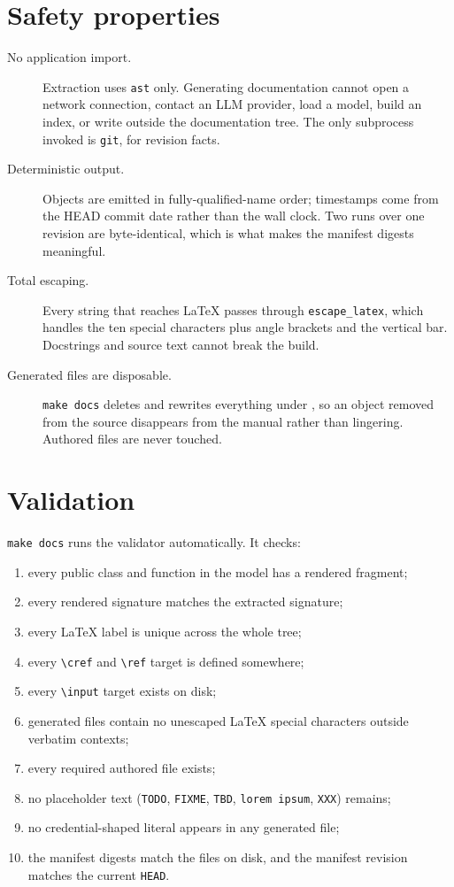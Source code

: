 \section{Safety properties}

\begin{description}
  \item[No application import.] Extraction uses \texttt{ast} only. Generating
    documentation cannot open a network connection, contact an LLM provider,
    load a model, build an index, or write outside the documentation tree. The
    only subprocess invoked is \texttt{git}, for revision facts.
  \item[Deterministic output.] Objects are emitted in fully-qualified-name
    order; timestamps come from the HEAD commit date rather than the wall
    clock. Two runs over one revision are byte-identical, which is what makes
    the manifest digests meaningful.
  \item[Total escaping.] Every string that reaches LaTeX passes through
    \texttt{escape\_latex}, which handles the ten special characters plus
    angle brackets and the vertical bar. Docstrings and source text cannot
    break the build.
  \item[Generated files are disposable.] \texttt{make docs} deletes and
    rewrites everything under , so an object
    removed from the source disappears from the manual rather than lingering.
    Authored files are never touched.
\end{description}

\section{Validation}
\label{sec:doc-validation}

\texttt{make docs} runs the validator automatically. It checks:

\begin{enumerate}[nosep]
  \item every public class and function in the model has a rendered fragment;
  \item every rendered signature matches the extracted signature;
  \item every LaTeX label is unique across the whole tree;
  \item every \texttt{\textbackslash cref} and \texttt{\textbackslash ref}
    target is defined somewhere;
  \item every \texttt{\textbackslash input} target exists on disk;
  \item generated files contain no unescaped LaTeX special characters outside
    verbatim contexts;
  \item every required authored file exists;
  \item no placeholder text (\texttt{TODO}, \texttt{FIXME}, \texttt{TBD},
    \texttt{lorem ipsum}, \texttt{XXX}) remains;
  \item no credential-shaped literal appears in any generated file;
  \item the manifest digests match the files on disk, and the manifest revision
    matches the current \texttt{HEAD}.
\end{enumerate}

